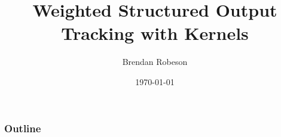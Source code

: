 \documentclass[mathserif,aspectratio=169]{beamer}
\title{Weighted Structured Output Tracking with Kernels}
\author{Brendan Robeson}
\date{\today}
\institute{Utah State University}
\begin{document}
\begin{frame}
    \titlepage
\end{frame}

\begin{frame}
    \frametitle{Outline}
    \tableofcontents
\end{frame}

%




\end{document}

